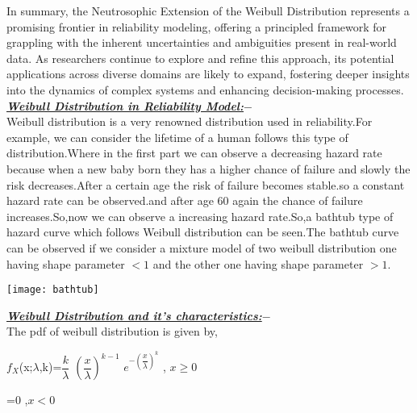 \documentclass[12pt,a4paper,oneside]{article}
\begin{document}
In summary, the Neutrosophic Extension of the Weibull Distribution represents a promising frontier in reliability modeling, offering a principled framework for grappling with the inherent uncertainties and ambiguities present in real-world data. As researchers continue to explore and refine this approach, its potential applications across diverse domains are likely to expand, fostering deeper insights into the dynamics of complex systems and enhancing decision-making processes.
\newpage
\textrm{\textit{\textbf{\underline{Weibull Distribution in Reliability Model:$-$}}}}\\
Weibull distribution is a very renowned distribution used in reliability.For example, we can consider the lifetime of a human follows this type of distribution.Where in the first part we can observe a decreasing hazard rate because when a new baby born they has a higher chance of failure and slowly the risk decreases.After a certain age the risk of failure becomes stable.so a constant hazard  rate can be observed.and after age $60$ again the chance of failure increases.So,now we can observe a increasing hazard rate.So,a bathtub type of hazard curve which follows Weibull distribution can be seen.The bathtub curve can be observed if we consider a mixture model of two weibull distribution one having shape parameter $<1$ and the other one having shape parameter $>1$. \\
\newline
\begin{center}
\hspace{2cm}
\texttt{[image: bathtub]}
\newline 
\end{center}
\vspace{2cm}
\textrm{\textit{\textbf{\underline{Weibull Distribution and it's characteristics:$-$}}}}\\
\newline
The pdf of weibull distribution is given by,\\
\newline
\begin{singlespace}
\hspace{5cm}$f_{X}$(x;${\lambda}$,k)=$\dfrac{k}{{\lambda}}$ $\left(\dfrac{x}{\lambda}\right)^{k-1}$ $e^{-\left(\dfrac{x}{\lambda}\right)^{k}}$ \hspace{1cm}, $x \geq 0$\\
\end{singlespace}
\hspace{6.7cm}=0 \hspace{4.1cm} ,$x < 0$\\
\end{document}
